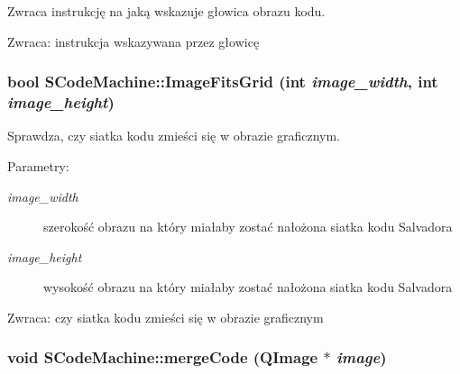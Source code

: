 Zwraca instrukcję na jaką wskazuje głowica obrazu kodu. \begin{Desc}
\item[Zwraca:]instrukcja wskazywana przez głowicę \end{Desc}
\hypertarget{classSCodeMachine_b4f7e9e538a378461a86418ea9dc1d5a}{
\subsubsection[{ImageFitsGrid}]{\setlength{\rightskip}{0pt plus 5cm}bool SCodeMachine::ImageFitsGrid (int {\em image\_\-width}, \/  int {\em image\_\-height})}}
\label{classSCodeMachine_b4f7e9e538a378461a86418ea9dc1d5a}


Sprawdza, czy siatka kodu zmieści się w obrazie graficznym. \begin{Desc}
\item[Parametry:]
\begin{description}
\item[{\em image\_\-width}]szerokość obrazu na który miałaby zostać nałożona siatka kodu Salvadora \item[{\em image\_\-height}]wysokość obrazu na który miałaby zostać nałożona siatka kodu Salvadora \end{description}
\end{Desc}
\begin{Desc}
\item[Zwraca:]czy siatka kodu zmieści się w obrazie graficznym \end{Desc}
\hypertarget{classSCodeMachine_fdc2ddde59a89a474c7d478a391829ba}{
\subsubsection[{mergeCode}]{\setlength{\rightskip}{0pt plus 5cm}void SCodeMachine::mergeCode (QImage $\ast$ {\em image})}}
\label{classSCodeMachine_fdc2ddde59a89a474c7d478a391829ba}


